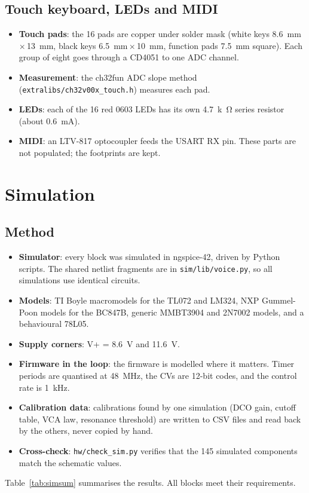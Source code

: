 \documentclass[11pt,a4paper]{article}
\newcommand{\file}[1]{\texttt{#1}}
\begin{document}
\subsection{Touch keyboard, LEDs and MIDI}
\begin{itemize}
  \item \textbf{Touch pads}: the 16 pads are copper under solder mask (white keys
    \SI{8.6}{mm}\,$\times$\,\SI{13}{mm}, black keys \SI{6.5}{mm}\,$\times$\,\SI{10}{mm}, function pads
    \SI{7.5}{mm} square). Each group of eight goes through a CD4051 to one ADC channel.
  \item \textbf{Measurement}: the ch32fun ADC slope method (\file{extralibs/ch32v00x\_touch.h}) measures
    each pad.
  \item \textbf{LEDs}: each of the 16 red 0603 LEDs has its own \SI{4.7}{k\ohm} series resistor (about
    \SI{0.6}{mA}).
  \item \textbf{MIDI}: an LTV-817 optocoupler feeds the USART RX pin. These parts are not populated; the
    footprints are kept.
\end{itemize}

\section{Simulation}\label{sec:sim}

\subsection{Method}
\begin{itemize}
  \item \textbf{Simulator}: every block was simulated in ngspice-42, driven by Python scripts. The shared
    netlist fragments are in \file{sim/lib/voice.py}, so all simulations use identical circuits.
  \item \textbf{Models}: TI Boyle macromodels for the TL072 and LM324, NXP Gummel-Poon models for the
    BC847B, generic MMBT3904 and 2N7002 models, and a behavioural 78L05.
  \item \textbf{Supply corners}: V+ = \SI{8.6}{V} and \SI{11.6}{V}.
  \item \textbf{Firmware in the loop}: the firmware is modelled where it matters. Timer periods are
    quantised at \SI{48}{MHz}, the CVs are 12-bit codes, and the control rate is \SI{1}{kHz}.
  \item \textbf{Calibration data}: calibrations found by one simulation (DCO gain, cutoff table, VCA law,
    resonance threshold) are written to CSV files and read back by the others, never copied by hand.
  \item \textbf{Cross-check}: \file{hw/check\_sim.py} verifies that the 145 simulated components match the
    schematic values.
\end{itemize}
Table~\ref{tab:simsum} summarises the results. All blocks meet their requirements.
\end{document}
